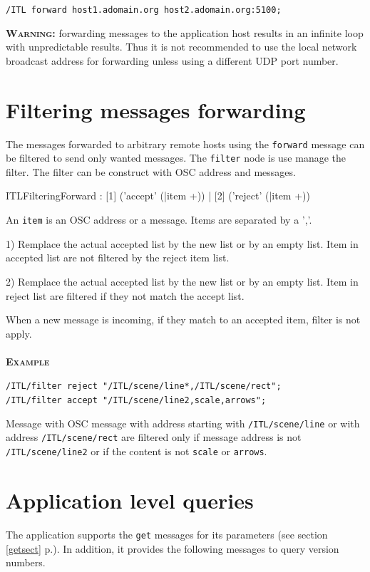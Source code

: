 \documentclass[a4paper,twoside]{report}
\newcommand{\sublevel}[1]	{\section{#1}}
\newcommand{\fullref}[1]	{\ref{#1} p.\pageref{#1}}
\newcommand{\OSC}[1]		{\texttt{#1}}
\newcommand{\example}		{\textbf{\hspace{-1.5cm}\textbf{\textsc{Example }}}}
\let\olditemize\itemize
\let\oldenditemize\enditemize
\renewenvironment{itemize} 	{\olditemize \setlength{\itemsep}{1mm}}{\oldenditemize}
\newcommand{\sample}	[1]			{\vspace{-2mm}\begin{center}\colorbox{mygrey}{
								\begin{minipage}[t]{0.9\columnwidth} 
								{\small \texttt{#1}}
								\end{minipage}}\end{center}}
\newcommand{\warning}[1]	{\textbf{\textsc{Warning:}} #1}
\begin{document}
\sample{/ITL forward host1.adomain.org host2.adomain.org:5100;}

\warning{forwarding messages to the application host results in an infinite loop with unpredictable results. Thus it is not recommended to use the local network broadcast address for forwarding unless using a different UDP port number.}


\sublevel{Filtering messages forwarding}
\label{ITLFilteringForward}

The messages forwarded to arbitrary remote hosts using the \OSC{forward} message can be filtered to send only wanted messages. The \OSC{filter} node is use manage the filter. The filter can be construct with OSC address and messages. 
 
\begin{rail}
ITLFilteringForward : [1] ('accept' (|item +)) | [2] ('reject' (|item +))
\end{rail}

An \OSC{item} is an OSC address or a message. Items are separated by a ','.
\begin{itemize}
\item 1) Remplace the actual accepted list by the new list or by an empty list. Item in accepted list are not filtered by the reject item list.
\item 2) Remplace the actual accepted list by the new list or by an empty list. Item in reject list are filtered if they not match the accept list.
\end{itemize}

When a new message is incoming, if they match to an accepted item, filter is not apply.\\ \\
\example\\
\sample{/ITL/filter reject "/ITL/scene/line*,/ITL/scene/rect"; \\
/ITL/filter accept "/ITL/scene/line2,scale,arrows";
}
Message with OSC message with address starting with \OSC{/ITL/scene/line} or with address \OSC{/ITL/scene/rect} are filtered only if message address is not \OSC{/ITL/scene/line2} or if the content is not \OSC{scale} or \OSC{arrows}.


\sublevel{Application level queries}
\label{ITLQuery}

The application supports the \OSC{get} messages for its parameters (see section \fullref{getsect}). In addition, it provides the following messages to query version numbers.
\end{document}
